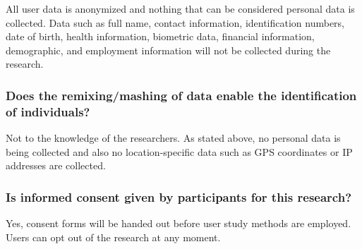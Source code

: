 \documentclass[a4paper]{article}
\begin{document}
All user data is anonymized and nothing that can be considered personal data is collected. Data such as full name, contact information, identification numbers, date of birth, health information, biometric data, financial information, demographic, and employment information will not be collected during the research.

\subsubsection{Does the remixing/mashing of data enable the identification of individuals?}

Not to the knowledge of the researchers. As stated above, no personal data is being collected and also no location-specific data such as GPS coordinates or IP addresses are collected.

\subsubsection{Is informed consent given by participants for this research?}

Yes, consent forms will be handed out before user study methods are employed. Users can opt out of the research at any moment.
\end{document}
